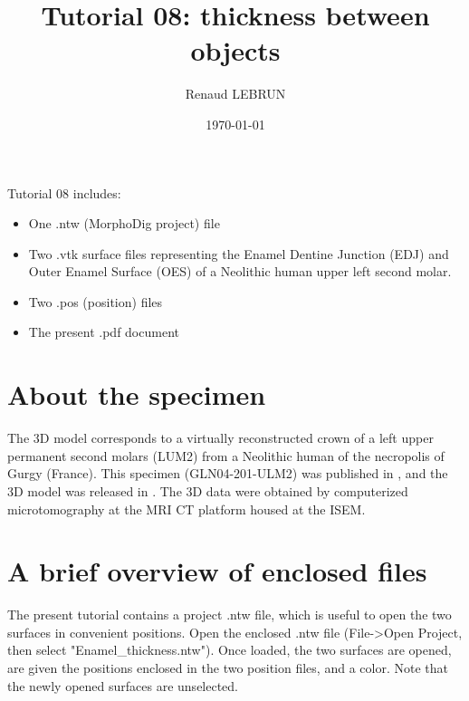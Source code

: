 \documentclass[12pt, a4paper]{book}
\title{Tutorial 08: thickness between objects}
\author{Renaud LEBRUN}
\affil{Institut des Sciences de l'Evolution, Université de Montpellier, France}
\date{\today}
\begin{document}
	\dominitoc

\maketitle


\faketableofcontents



\minitoc 
Tutorial 08 includes:
\begin{itemize}
\item One .ntw (MorphoDig project) file
\item Two .vtk surface files representing the Enamel Dentine Junction (EDJ) and Outer Enamel Surface (OES) of a Neolithic human upper left second molar.
\item Two .pos (position) files 
\item The present .pdf document
\end{itemize}



\section{About the specimen}
The 3D model corresponds to a virtually reconstructed crown of a left upper permanent second molars (LUM2) from a Neolithic human of the necropolis of Gurgy (France). This specimen (GLN04-201-ULM2) was published in \citet{LeLuyer2016}, and the 3D model was released in \citet{LeLuyer2016a}.
The 3D data were obtained by computerized microtomography at the MRI \si{\micro}CT platform housed at the ISEM. 


\section{A brief overview of enclosed files}
		
The present tutorial contains a project .ntw file, which is useful to open the two surfaces in convenient positions. Open the enclosed .ntw file (File->Open Project, then select "Enamel\_thickness.ntw"). Once loaded, the two surfaces are opened, are given the positions enclosed in the two position files, and a color. Note that the newly opened surfaces are unselected.
\end{document}
